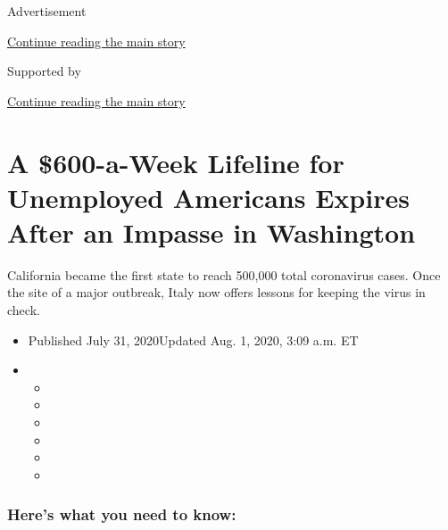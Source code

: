 Advertisement

\protect\hyperlink{after-top}{Continue reading the main story}

Supported by

\protect\hyperlink{after-sponsor}{Continue reading the main story}

\hypertarget{a-600-a-week-lifeline-for-unemployed-americans-expires-after-an-impasse-in-washington}{%
\section{A \$600-a-Week Lifeline for Unemployed Americans Expires After
an Impasse in
Washington}\label{a-600-a-week-lifeline-for-unemployed-americans-expires-after-an-impasse-in-washington}}

California became the first state to reach 500,000 total coronavirus
cases. Once the site of a major outbreak, Italy now offers lessons for
keeping the virus in check.

\begin{itemize}
\item
  Published July 31, 2020Updated Aug. 1, 2020, 3:09 a.m. ET
\item
  \begin{itemize}
  \item
  \item
  \item
  \item
  \item
  \item
  \end{itemize}
\end{itemize}

\hypertarget{heres-what-you-need-to-know}{%
\subsubsection{Here's what you need to
know:}\label{heres-what-you-need-to-know}}

